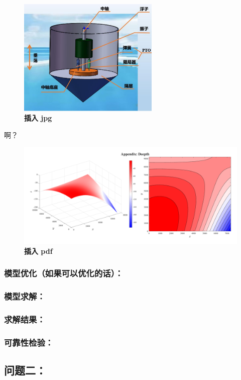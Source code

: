 \documentclass[zihao=-4,UTF8]{article}
\begin{document}
\begin{figure}[H]
  \centering
  \includegraphics[width=0.6\textwidth]{assets/波浪能装置示意图.jpg}
  \caption{\textbf{插入 jpg}}\label{插入 jpg}
\end{figure}
啊？
\begin{figure}[H]
  \centering
  \includegraphics[width=\textwidth]{assets/2024-08-15_02-04-29.pdf}
  \caption{\textbf{插入 pdf}}\label{插入 pdf}
\end{figure}

\subsubsection{模型优化（如果可以优化的话）：}
\subsubsection{模型求解：}
\subsubsection{求解结果：}
\subsubsection{可靠性检验：}

\subsection{问题二：}
\end{document}
